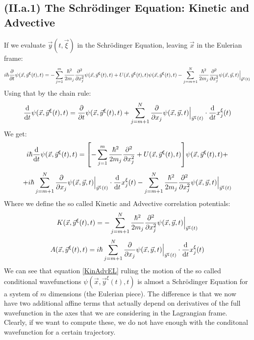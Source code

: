 \documentclass[11pt, a4paper]{article} %
\begin{document}
\subsection*{(II.a.1) The Schrödinger Equation: Kinetic and Advective}
If we evaluate $\vec{y}(t,\vec{\xi})$ in the Schrödinger Equation, leaving $\vec{x}$ in the Eulerian frame:
\begin{equation}
i\hbar \pdv{}{t}\psi(\vec{x}, \vec{y}^\xi(t),t)=-\sum_{j=1}^m \frac{\hbar^2}{2m_j}\pdv[2]{}{x_j} \psi(\vec{x}, \vec{y}^\xi(t),t) + U(\vec{x}, \vec{y}^\xi(t),t)\psi(\vec{x}, \vec{y}^\xi(t),t) -\sum_{j=m+1}^N \frac{\hbar^2}{2m_j}\pdv[2]{}{x_j} \psi(\vec{x}, \vec{y},t)\Big\rvert_{\vec{y}^\xi(t)}
\end{equation}
Using that by the chain rule:
\begin{equation}
\dv{}{t}\psi(\vec{x}, \vec{y}^\xi(t),t)=\pdv{}{t}\psi(\vec{x}, \vec{y}^\xi(t),t)+\sum_{j=m+1}^N \pdv{}{x_j}\psi(\vec{x}, \vec{y},t)\Big\rvert_{\vec{y}^\xi(t)}\cdot \dv{}{t}x^\xi_j(t)
\end{equation}
We get:
\begin{equation}\label{KinAdvEL}
i\hbar \dv{}{t}\psi(\vec{x}, \vec{y}^\xi(t),t)=\qty[-\sum_{j=1}^m \frac{\hbar^2}{2m_j}\pdv[2]{}{x_j} + U(\vec{x}, \vec{y}^\xi(t),t)]\psi(\vec{x}, \vec{y}^\xi(t),t)+
\end{equation}
$$
+i\hbar\sum_{j=m+1}^N \pdv{}{x_j}\psi(\vec{x}, \vec{y},t)\Big\rvert_{\vec{y}^\xi(t)}\cdot \dv{}{t}x^\xi_j(t) -\sum_{j=m+1}^N \frac{\hbar^2}{2m_j}\pdv[2]{}{x_j} \psi(\vec{x}, \vec{y},t)\Big\rvert_{\vec{y}^\xi(t)}
$$
Where we define the so called Kinetic and Advective correlation potentials:
\begin{equation}\label{KinEL}
K(\vec{x}, \vec{y}^\xi(t),t)=-\sum_{j=m+1}^N \frac{\hbar^2}{2m_j}\pdv[2]{}{x_j} \psi(\vec{x}, \vec{y},t)\Big\rvert_{\vec{y}^\xi(t)}
\end{equation}
\begin{equation}\label{AdvEL}
A(\vec{x}, \vec{y}^\xi(t),t)=i\hbar\sum_{j=m+1}^N \pdv{}{x_j}\psi(\vec{x}, \vec{y},t)\Big\rvert_{\vec{y}^\xi(t)}\cdot \dv{}{t}x^\xi_j(t)
\end{equation}
We can see that equation \eqref{KinAdvEL} ruling the motion of the so called conditional wavefunctions $\psi(\vec{x}, \vec{y}^\xi(t),t)$ is almost a Schrödinger Equation for a system of $m$ dimensions (the Eulerian piece). The difference is that we now have two additional affine terms that actually depend on derivatives of the full wavefunction in the axes that we are considering in the Lagrangian frame. Clearly, if we want to compute these, we do not have enough with the conditonal wavefunction for a certain trajectory. 
\end{document}
